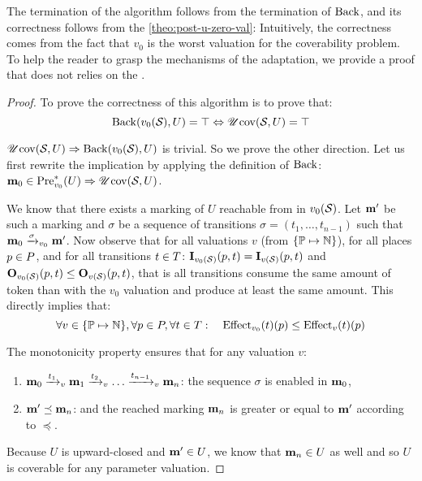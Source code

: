 The termination of the algorithm follows from the termination of $\back$, and its correctness follows from the \autoref{theo:post-u-zero-val}:
Intuitively, the correctness comes from the fact that $v_0$ is the worst valuation for the coverability problem.
To help the reader to grasp the mechanisms of the adaptation, we provide a proof that does not relies on the .
\begin{proof}
  To prove the correctness of this algorithm is to prove that:
  \[
    \back(v_0(\namePPN), U) = \top \Leftrightarrow \UcovOp(\namePPN, U) = \top
  \]

$\UcovOp(\namePPN, U) \Rightarrow \back(v_0(\namePPN), U)$ is trivial. So we prove the other direction. Let us first rewrite the implication by applying the definition of $\back$: $\mari \in \Pre_{v_0}^*(U) \Rightarrow \UcovOp(\namePPN, U)$.


  We know that there exists a marking of $U$ reachable from \mari in $v_0(\namePPN)$.
  Let $\marp$ be such a marking and $\sigma$ be a sequence of transitions $\sigma = (t_1, \dots, t_{n-1})$ such that $\mari \fire[{v_0}]{\sigma} \marp$.
  Now observe that for all valuations $v$ (from $\{\parameters \mapsto \naturals\}$), for all places $p \in \places$, and for all transitions $t \in \transitions$: $\matI_{v_0(\namePPN)}(p,t) = \matI_{v(\namePPN)}(p,t)$ and $\matO_{v_0(\namePPN)}(p,t) \leq \matO_{v(\namePPN)}(p,t)$, that is all transitions consume the same amount of token than with the $v_0$ valuation and produce at least the same amount. This directly implies that: 
  \[
    \forall v \in \{\parameters \mapsto \naturals\}, \forall p \in \places, \forall t \in \transitions :
  \quad
  \Effect_{v_0}(t)(p) \leq \Effect_v(t)(p)
  \]

The monotonicity property ensures that for any valuation $v$:
  \begin{enumerate}
    \item $\mari \fire[v]{t_1} \mar_1 \fire[v]{t_2} \dots \fire[v]{t_{n-1}} \mar_n$: the sequence $\sigma$ is enabled  in $\mari$,
    \item $\marp \preceq \mar_n$: and the reached marking $\mar_n$ is greater or equal to $\marp$ according to $\preceq$.
  \end{enumerate}

  Because $U$ is upward-closed and $\marp \in U$, we know that $\mar_n \in U$ as well and so $U$ is coverable for any parameter valuation.
\end{proof}

